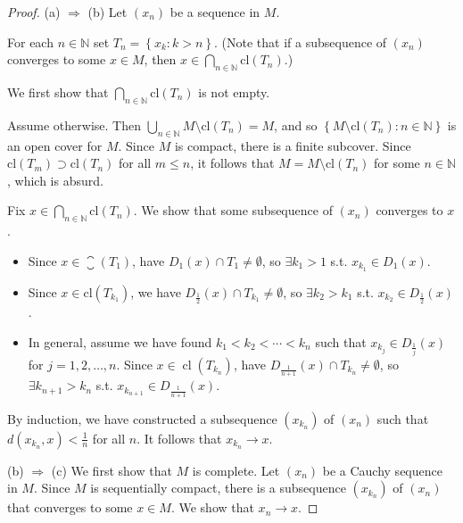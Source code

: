 \documentclass[a4paper]{article}
\begin{document}
\begin{proof}
    (a) $\Longrightarrow$ (b) Let $\left(x_{n}\right)$ be a sequence in $M$.

For each $n \in \mathbb{N}$ set $T_{n}=\left\{x_{k}: k>n\right\}$. (Note that if a subsequence of $\left(x_{n}\right)$ converges to some $x \in M$, then $x \in \bigcap_{n \in \mathbb{N}} \mathrm{cl}\left(T_{n}\right)$.)

We first show that $\bigcap_{n \in \mathbb{N}} \mathrm{cl}\left(T_{n}\right)$ is not empty. 

Assume otherwise. Then $\bigcup_{n \in \mathbb{N}} M \setminus \mathrm{cl}\left(T_{n}\right)=M$, and so $\left\{M \setminus \mathrm{cl}\left(T_{n}\right): n \in \mathbb{N}\right\}$ is an open cover for $M$. Since $M$ is compact, there is a finite subcover. Since $\mathrm{cl}\left(T_{m}\right) \supset \mathrm{cl}\left(T_{n}\right)$ for all $m \leqslant n$, it follows that $M=M \setminus \mathrm{cl}\left(T_{n}\right)$ for some $n \in \mathbb{N}$, which is absurd.

Fix $x \in \bigcap_{n \in \mathbb{N}} \mathrm{cl}\left(T_{n}\right)$. We show that some subsequence of $\left(x_{n}\right)$ converges to $x$. 
\begin{itemize}
    \item Since $x \in \closure\left(T_{1}\right)$, have $D_{1}(x) \cap T_{1} \neq \emptyset$, so $\exists k_{1}>1$ s.t. $x_{k_{1}} \in D_{1}(x)$. 
    
    \item Since $x \in \mathrm{cl}\left(T_{k_{1}}\right)$, we have $D_{\frac{1}{2}}(x) \cap T_{k_{1}} \neq \emptyset$, so $\exists k_{2}>k_{1}$ s.t. $x_{k_{2}} \in D_{\frac{1}{2}}(x)$. 
    
    \item In general, assume we have found $k_{1}<k_{2}<\cdots<k_{n}$ such that $x_{k_{j}} \in D_{\frac{1}{j}}(x)$ for $j=1,2, \ldots, n$. Since $x \in \operatorname{cl}\left(T_{k_{n}}\right)$, have $D_{\frac{1}{n+1}}(x) \cap T_{k_{n}} \neq \emptyset$, so $\exists k_{n+1}>k_{n}$ s.t. $x_{k_{n+1}} \in D_{\frac{1}{n+1}}(x)$. 
\end{itemize}

By induction, we have constructed a subsequence $\left(x_{k_{n}}\right)$ of $\left(x_{n}\right)$ such that $d\left(x_{k_{n}}, x\right)<\frac{1}{n}$ for all $n$. It follows that $x_{k_{n}} \rightarrow x$.

(b) $\Longrightarrow$ (c) We first show that $M$ is complete. 
Let $\left(x_{n}\right)$ be a Cauchy sequence in $M$. Since $M$ is sequentially compact, there is a subsequence $\left(x_{k_{n}}\right)$ of $\left(x_{n}\right)$ that converges to some $x \in M$. We show that $x_{n} \rightarrow x$. 


\end{proof}
\end{document}
